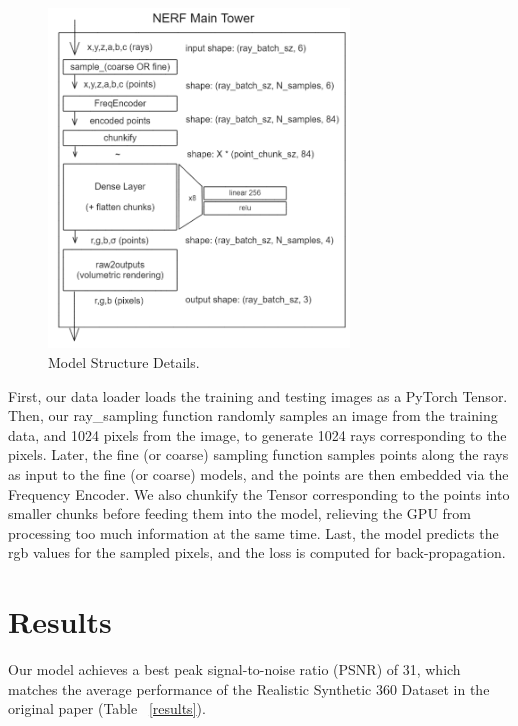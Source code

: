 \begin{figure}[h]
    \centering
    \includegraphics[width=80mm,scale=0.5]{images/nerf_arch_new.png}
    \caption{Model Structure Details.}
    \label{details}
\end{figure}
First, our data loader loads the training and testing images as a PyTorch Tensor. Then, our ray\_sampling function randomly samples an image from the training data, and 1024 pixels from the image, to generate 1024 rays corresponding to the pixels. Later, the fine (or coarse) sampling function samples points along the rays as input to the fine (or coarse) models, and the points are then embedded via the Frequency Encoder. We also chunkify the Tensor corresponding to the points into smaller chunks before feeding them into the model, relieving the GPU from processing too much information at the same time. Last, the model predicts the rgb values for the sampled pixels, and the loss is computed for back-propagation.



\section{Results}
Our model achieves a best peak signal-to-noise ratio (PSNR) of 31, which matches the average performance of the Realistic Synthetic 360{\textdegree} Dataset in the original paper (Table ~\ref{results}).

